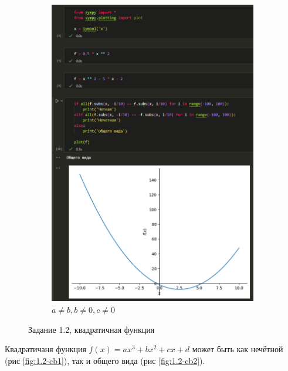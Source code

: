 \documentclass[14pt,a4paper]{extarticle}
\begin{document}
\begin{figure}[h!]
\begin{subfigure}{.5\textwidth}
        \includegraphics[width=0.9\linewidth]{figures//inftech//lab1/1.2-sq2.png}
        \caption{$a\neq b, b\neq 0,c\neq 0$}
        \label{fig:1.2-sq2}
    \end{subfigure}
    \caption{Задание 1.2, квадратичная функция}
    \label{fig:1.2-sq}
\end{figure}

Квадратичаня функция $f(x)=ax^3+bx^2+cx+d$ может быть как нечётной (рис \ref{fig:1.2-cb1}),
так и общего вида (рис \ref{fig:1.2-cb2}).
\newpage
\end{document}
